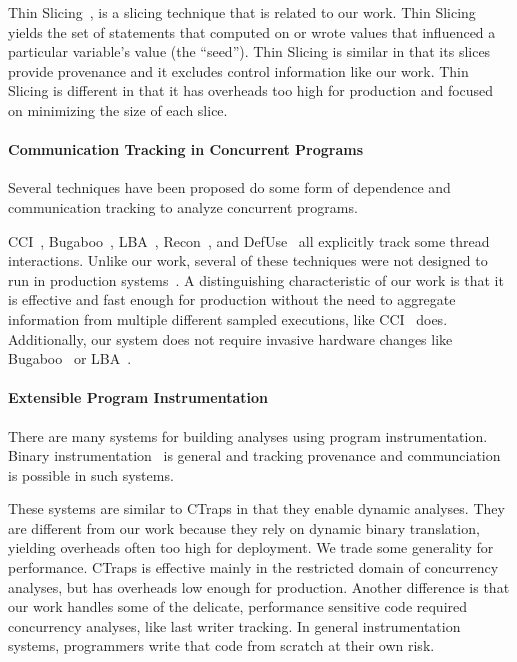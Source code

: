 \documentclass[preprint,9pt]{sigplanconf}
\newcommand{\ctraps}{CTraps\xspace}
\begin{document}
Thin Slicing~\cite{thinslicing}, is a slicing technique that is related to our
work.  Thin Slicing yields the set of statements that computed on or wrote
values that influenced a particular variable's value (the ``seed'').  Thin
Slicing is similar in that its slices provide provenance and it excludes
control information like our work.  Thin Slicing is different in that it has
overheads too high for production and focused on minimizing the size 
of each slice. 


\paragraph{Communication Tracking in Concurrent Programs}
Several techniques have been proposed do some form of dependence and
communication tracking to analyze concurrent programs.  

CCI~\cite{cci}, Bugaboo~\cite{bugaboo}, LBA~\cite{paralog}, Recon~\cite{recon},
and DefUse~\cite{defuse} all explicitly track some thread interactions.  Unlike
our work, several of these techniques were not designed to run in production
systems~\cite{recon,defuse}.  A distinguishing characteristic of our work is
that it is effective and fast enough for production without the need to
aggregate information from multiple different sampled executions, like
CCI~\cite{cci} does.  Additionally, our system does not require invasive
hardware changes like Bugaboo~\cite{bugaboo} or LBA~\cite{paralog}.

\paragraph{Extensible Program Instrumentation} 
There are many systems for building analyses using program instrumentation.
Binary instrumentation~\cite{pin,dynamorio,valgrind,roadrunner} is general and
tracking provenance and communciation is possible in such systems.  

These systems are similar to \ctraps in that they enable dynamic analyses.
They are different from our work because they rely on dynamic binary
translation, yielding overheads often too high for deployment.  We trade some
generality for performance. \ctraps is effective mainly in the restricted
domain of concurrency analyses, but has overheads low enough for production.
Another difference is that our work handles some of the delicate, performance
sensitive code required concurrency analyses, like last writer tracking.  In
general instrumentation systems, programmers write that code from scratch at
their own risk.  
\end{document}
